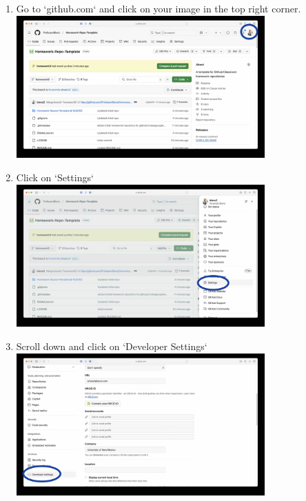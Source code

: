 \documentclass{article} %
\begin{document}
\begin{enumerate}
    \item Go to `github.com` and click on your image in the top right corner.\\
    \includegraphics[width=0.75\textwidth]{figs/1picture.jpg}

    \item Click on `Settings`\\
    \includegraphics[width=0.75\textwidth]{figs/2settings.jpg}

    \item Scroll down and click on `Developer Settings`\\
    \includegraphics[width=0.75\textwidth]{figs/3developersettings.jpg}


\end{enumerate}
\end{document}
